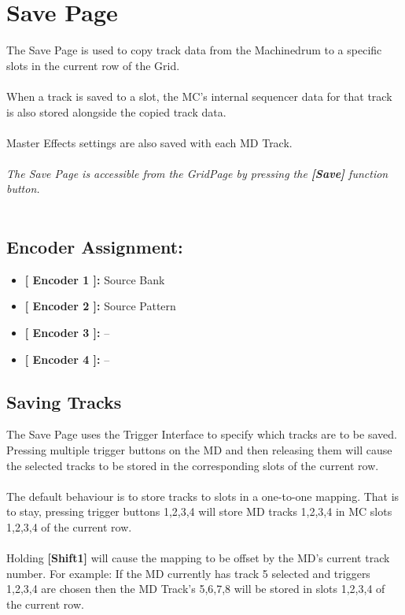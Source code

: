 \chapter{Save Page}

The Save Page is used to copy track data from the Machinedrum to a specific slots in the current row of the Grid. \\
\\
When a track is saved to a slot, the MC's internal sequencer data for that track is also stored alongside the copied track data.\\
\\
Master Effects settings are also saved with each MD Track.
\\\\
\textit{The Save Page is accessible from the GridPage by pressing the  \textbf{[Save]} function button.}
\\\\
\section{Encoder Assignment:}
\begin{itemize}
	\item \textbf{[ Encoder 1 ]: }Source Bank
	\item \textbf{[ Encoder 2 ]: }Source Pattern
	\item \textbf{[ Encoder 3 ]: }--
	\item \textbf{[ Encoder 4 ]: }--
\end{itemize}
\section{Saving Tracks}
The Save Page uses the Trigger Interface to specify which tracks are to be saved. Pressing multiple trigger buttons on the MD and then releasing them will cause the selected tracks to be stored in the corresponding slots of the current row.\\
\\
The default behaviour is to store tracks to slots in a one-to-one mapping. That is to stay, pressing trigger buttons 1,2,3,4 will store MD tracks 1,2,3,4 in MC slots 1,2,3,4 of the current row.\\
\\
Holding \textbf{[Shift1]} will cause the mapping to be offset by the MD's current track number. For example: If the MD currently has track 5 selected and triggers 1,2,3,4 are chosen then the MD Track's 5,6,7,8 will be stored in slots 1,2,3,4 of the current row.
